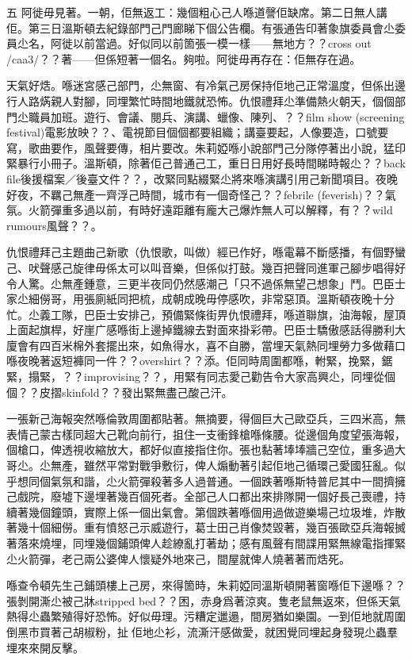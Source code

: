 五
阿徙毋見著。一朝，佢無返工：幾個粗心己人喺道謦佢缺席。第二日無人講佢。第三日溫斯頓去紀錄部門己門廊睇下個公告欄。有張通告印著𧰼旗委員會尐委員尐名，阿徙以前當過。好似同以前箇張一模一樣——無地方？？cross out /caa3/？？著——但係短著一個名。夠啦。阿徙毋再存在：佢無存在過。

天氣好焅。喺迷宮感己部門，尐無窗、有冷氣己房保持佢地己正常溫度，但係出邊行人路焫親人對腳，同埋繁忙時間地鐵就恐怖。仇恨禮拜尐準備熱火朝天，個個部門尐職員加班。遊行、會議、閱兵、演講、蠟像、陳列、？？film show (screening festival)電影放映？？、電視節目個個都要組織；講臺要起，人像要造，口號要寫，歌曲要作，風聲要傳，相片要改。朱莉婭喺小說部門己分隊停著出小說，猛印緊暴行小冊子。溫斯頓，除著佢己普通己工，重日日用好長時間睇時報尐？？back file後援檔案／後臺文件？？，改緊同點綴緊尐將來喺演講引用己新聞項目。夜晚好夜，不羈己無產一齊浮己時間，城市有一個奇怪己？？febrile (feverish)？？氣氛。火箭彈重多過以前，有時好遠距離有龐大己爆炸無人可以解釋，有？？wild rumours風聲？？。

仇恨禮拜己主題曲己新歌（仇恨歌，叫做）經已作好，喺電幕不斷感播，有個野蠻己、吠聲感己旋律毋係太可以叫音樂，但係似打鼓。幾百把聲同進軍己腳步唱得好令人驚。尐無產鍾意，三更半夜同仍然感潮己「只不過係無望己想𧰼」鬥。巴臣士家尐細僗哥，用張廁紙同把梳，成朝成晚毋停感吹，非常惡頂。溫斯頓夜晚十分忙。尐義工隊，巴臣士安排己，預備緊條街畀仇恨禮拜，喺道聯旗，油海報，屋頂上面起旗桿，好崖广感喺街上邊掉鐵線去對面來掛彩帶。巴臣士驕傲感話得勝利大廈會有四百米棉外套擺出來，如魚得水，喜不自勝，當埋天氣熱同埋勞力多做藉口喺夜晚著返短褲同一件？？overshirt？？添。佢同時周圍都喺，軵緊，挽緊，鋸緊，搨緊，？？improvising？？，用緊有同志愛己勸告令大家高興尐，同埋從個個？？皮摺skinfold？？發出緊無盡己酸己汗。

一張新己海報突然喺倫敦周圍都貼著。無摘要，得個巨大己歐亞兵，三四米高，無表情己蒙古樣同超大己靴向前行，抯住一支衝鋒槍喺條腰。從邊個角度望張海報，個槍口，俾透視收縮放大，都好似直接指住你。張也黏著埲埲牆己空位，重多過大哥尐。尐無產，雖然平常對戰爭敷衍，俾人煽動著引起佢地己循環己愛國狂亂。似乎想同個氣氛和諧，尐火箭彈殺著多人過普通。一個跌著喺斯特普尼其中一間擠擁己戲院，廢墟下邊埋著幾百個死者。全部己人口都出來排隊開一個好長己喪禮，持續著幾個鐘頭，實際上係一個出氣會。第個跌著喺個用過做遊樂場己垃圾堆，炸散著幾十個細僗。重有憤怒己示威遊行，葛士田己肖像焚毀著，幾百張歐亞兵海報搣著落來燒埋，同埋幾個鋪頭俾人趁繚亂打著劫；感有風聲有間諜用緊無線電指揮緊尐火箭彈，老己兩公婆俾人懷疑外地來己，間屋就俾人燒著著而焅死。

喺查令頓先生己鋪頭樓上己房，來得箇時，朱莉婭同溫斯頓開著窗喺佢下邊喺？？張剝開澌尐被己牀stripped bed？？困，赤身爲著涼爽。隻老鼠無返來，但係天氣熱得尐蟲繁殖得好恐怖。好似毋理。污糟定邋遢，間房猶如樂園。一到佢地就周圍倒黑市買著己胡椒粉，扯𠞉佢地尐衫，流澌汗感做愛，就困覺同埋起身發現尐蟲羣埋來來開反擊。

